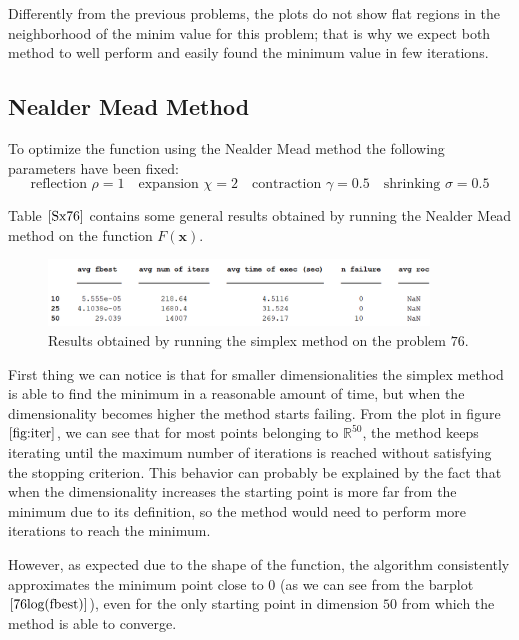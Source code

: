 Differently from the previous problems, the plots do not show flat regions in the neighborhood of the minim value for this problem; that is why we expect both method to well perform and easily found the minimum value in few iterations.  

\medskip
\subsection*{Nealder Mead Method}
To optimize the function using the Nealder Mead method the following parameters have been fixed:
\begin{equation*}
    \text{reflection } \rho = 1 \quad
    \text{expansion } \chi = 2 \quad
    \text{contraction } \gamma = 0.5 \quad
    \text{shrinking } \sigma = 0.5
\end{equation*}

Table $\eqref{Sx76}$ contains some general results obtained by running the Nealder Mead method on the function $F(\mathbf{x})$.

\begin{figure}[htbp]
    \centering
    \includegraphics[width = 0.9\textwidth]{img/pb76_table_SX.png}
    \caption{Results obtained by running the simplex method on the problem $76$.}
    \label{Sx76}
\end{figure}

First thing we can notice is that for smaller dimensionalities the simplex method is able to find the minimum in a reasonable amount of time, but when the dimensionality becomes higher the method starts failing.
From the plot in figure $\eqref{fig:iter}$, we can see that for most points belonging to $\mathbb{R}^{50}$, the method keeps iterating until the maximum number of iterations is reached without satisfying the stopping criterion.
This behavior can probably be explained by the fact that when the dimensionality increases the starting point is more far from the minimum due to its definition, so the method would need to perform more iterations to reach the minimum.

However, as expected due to the shape of the function, the algorithm consistently approximates the minimum point close to $0$ (as we can see from the barplot $\eqref{76log(fbest)}$), even for the only starting point in dimension $50$ from which the method is able to converge.

